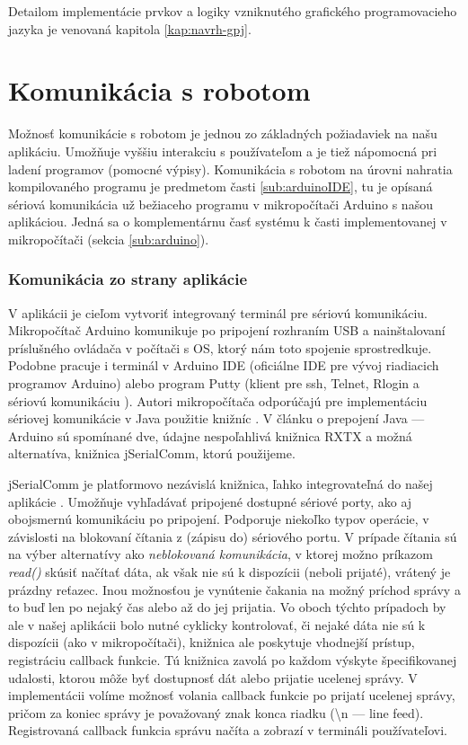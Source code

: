 Detailom implementácie prvkov a logiky vzniknutého grafického programovacieho jazyka je venovaná kapitola \ref{kap:navrh-gpj}.


\section{Komunikácia s robotom}
Možnosť komunikácie s robotom je jednou zo základných požiadaviek na našu aplikáciu. Umožňuje vyššiu interakciu s používateľom a je tiež nápomocná pri ladení programov (pomocné výpisy). Komunikácia s robotom na úrovni nahratia kompilovaného programu je predmetom časti \ref{sub:arduinoIDE}, tu je opísaná sériová komunikácia už bežiaceho programu v mikropočítači Arduino s našou aplikáciou. Jedná sa o komplementárnu časť systému k časti implementovanej v mikropočítači (sekcia \ref{sub:arduino}).

\subsubsection{Komunikácia zo strany aplikácie}
V aplikácii je cieľom vytvoriť integrovaný terminál pre sériovú komunikáciu. Mikropočítač Arduino komunikuje po pripojení rozhraním USB a nainštalovaní príslušného ovládača v počítači s OS, ktorý nám toto spojenie sprostredkuje. Podobne pracuje i terminál v Arduino IDE (oficiálne IDE pre vývoj riadiacich programov Arduino) alebo program Putty (klient pre ssh, Telnet, Rlogin a sériovú komunikáciu \cite{putty}). Autori mikropočítača odporúčajú pre implementáciu sériovej komunikácie v Java použitie knižníc \cite{arduinoAndJava}. V článku o prepojení Java --- Arduino sú spomínané dve, údajne nespoľahlivá knižnica RXTX a možná alternatíva, knižnica jSerialComm, ktorú použijeme. 

jSerialComm je platformovo nezávislá knižnica, ľahko integrovateľná do našej aplikácie \cite{jSerialComm}. Umožňuje vyhľadávať pripojené dostupné sériové porty, ako aj obojsmernú komunikáciu po pripojení. Podporuje niekoľko typov operácie, v závislosti na blokovaní čítania z (zápisu do) sériového portu. V prípade čítania sú na výber alternatívy ako \textit{neblokovaná komunikácia}, v ktorej možno príkazom \textit{read()} skúsiť načítať dáta, ak však nie sú k dispozícii (neboli prijaté), vrátený je prázdny reťazec. Inou možnosťou je vynútenie čakania na možný príchod správy a to buď len po nejaký čas alebo až do jej prijatia. Vo oboch týchto prípadoch by ale v našej aplikácii bolo nutné cyklicky kontrolovať, či nejaké dáta nie sú k dispozícii (ako v mikropočítači), knižnica ale poskytuje vhodnejší prístup, registráciu callback funkcie. Tú knižnica zavolá po každom výskyte špecifikovanej udalosti, ktorou môže byť dostupnosť dát alebo prijatie ucelenej správy. V implementácii volíme možnosť volania callback funkcie po prijatí ucelenej správy, pričom za koniec správy je považovaný znak konca riadku (\textbackslash n --- line feed). Registrovaná callback funkcia správu načíta a zobrazí v termináli používateľovi.

